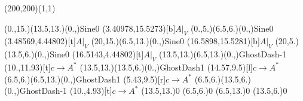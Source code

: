 \unitlength=1bp%

\begin{feynartspicture}(200,200)(1,1)

\FADiagram{}
\FAProp(0.,15.)(13.5,13.)(0.,){Sine}{0}
\FALabel(3.40978,15.5273)[b]{$A|_V$}
\FAProp(0.,5.)(6.5,6.)(0.,){Sine}{0}
\FALabel(3.48569,4.44802)[t]{$A|_V$}
\FAProp(20,15.)(6.5,13.)(0.,){Sine}{0}
\FALabel(16.5898,15.5281)[b]{$A|_V$}
\FAProp(20,5.)(13.5,6.)(0.,){Sine}{0}
\FALabel(16.5143,4.44802)[t]{$A|_V$}
\FAProp(13.5,13.)(6.5,13.)(0.,){GhostDash}{-1}
\FALabel(10.,11.93)[t]{$c\to A^*$}
\FAProp(13.5,13.)(13.5,6.)(0.,){GhostDash}{1}
\FALabel(14.57,9.5)[l]{$c\to A^*$}
\FAProp(6.5,6.)(6.5,13.)(0.,){GhostDash}{1}
\FALabel(5.43,9.5)[r]{$c\to A^*$}
\FAProp(6.5,6.)(13.5,6.)(0.,){GhostDash}{-1}
\FALabel(10.,4.93)[t]{$c\to A^*$}
\FAVert(13.5,13.){0}
\FAVert(6.5,6.){0}
\FAVert(6.5,13.){0}
\FAVert(13.5,6.){0}
\end{feynartspicture}

